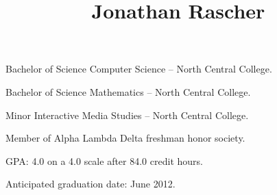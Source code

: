 \documentclass[12pt]{simplecv}
\begin{document}
  \leftheader{
    \contactemail \\
    \contactphone
  }

  \rightheader{
    \contactaddressone \\
    \contactaddresstwo
  }

  \title{Jonathan Rascher}
  \maketitle

  \begin{topic}
    \item[Bachelor of Science] Computer Science -- North Central College.

    \item[Bachelor of Science] Mathematics -- North Central College.

    \item[Minor] Interactive Media Studies -- North Central College.

    \item Member of Alpha Lambda Delta freshman honor society.

    \item GPA: 4.0 on a 4.0 scale after 84.0 credit hours.

    \item Anticipated graduation date: June 2012.
  \end{topic}
\end{document}
